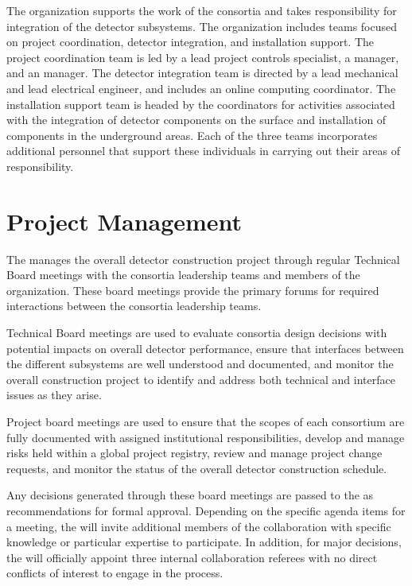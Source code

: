 The  organization supports the work of the consortia and
takes responsibility for integration of the detector
subsystems.  The organization includes teams focused on project
coordination, detector integration, and installation support.  The
project coordination team is led by a lead project controls
specialist, a  manager, and an  manager.  The
detector integration team is directed by a lead mechanical and lead
electrical engineer, and includes an online computing coordinator.
The installation support team is headed by the coordinators for
activities associated with the integration of detector components on
the surface and installation of components in the underground areas.
Each of the three teams incorporates additional personnel that support
these individuals in carrying out their areas of responsibility.

\section{Project Management}
\label{sec:pm}


The  manages the overall detector construction
project through regular Technical Board meetings with the consortia leadership
teams and members of the  organization.  These
board meetings provide the primary forums for required interactions
between the consortia leadership teams.

Technical Board meetings are used to evaluate consortia design
decisions with potential impacts on overall detector performance,
ensure that interfaces between the different subsystems are well
understood and documented, and monitor the overall construction
project to identify and address both technical and interface issues as
they arise.

Project board meetings are used to ensure that the scopes of each
consortium are fully documented with assigned institutional
responsibilities, develop and manage risks held within a global
project registry, review and manage project change requests, and
monitor the status of the overall detector construction schedule.

Any decisions generated through these board meetings are passed to the
  as recommendations for formal approval.
Depending on the specific agenda items %
for a meeting, the  will invite additional members of
the collaboration with specific knowledge or particular expertise to
participate.  In addition, for major decisions, the 
will officially appoint three internal collaboration
referees with no direct conflicts of interest to engage in the
process.

